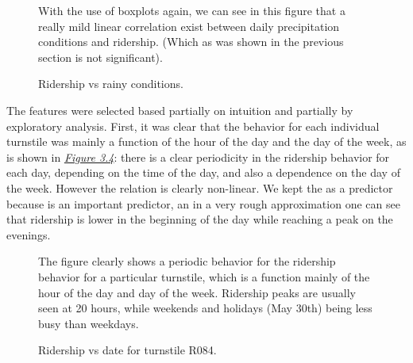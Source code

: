 \documentclass[a4paper,12pt,english]{sphinxmanual}
\begin{document}
\begin{figure}[htbp]
\centering
\capstart

\caption{Ridership vs rainy conditions.}{\small 
With the use of boxplots again, we can see in this figure that a really mild
linear correlation exist between daily precipitation conditions and
ridership. (Which as was shown in the previous section is not significant).
}\label{section2:figure33}\end{figure}

The features were selected based partially on intuition and partially by
exploratory analysis. First, it was clear that the behavior for each individual
turnstile was mainly a function of the hour of the day and the day of the week,
as is shown in {\hyperref[section2:figure34]{\emph{Figure 3.4}}}: there is a clear periodicity in the
ridership behavior for each day, depending on the time of the day, and also a
dependence on the day of the week. However the relation is clearly non-linear.
We kept the  as a predictor because is an important predictor, an in a
very rough approximation one can see that ridership is lower in the beginning
of the day while reaching a peak on the evenings.
\begin{figure}[htbp]
\centering
\capstart

\caption{Ridership vs date for turnstile R084.}{\small 
The figure clearly shows a periodic behavior for the ridership behavior for
a particular turnstile, which is a function mainly of the hour of the day and
day of the week. Ridership peaks are usually seen at 20 hours, while weekends
and holidays (May 30th) being less busy than weekdays.
}\label{section2:figure34}\end{figure}
\end{document}
